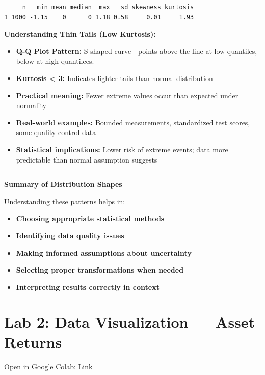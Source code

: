 \documentclass[
  12pt,
  a4paper,
]{scrbook}
\providecommand{\tightlist}{%
  \setlength{\itemsep}{0pt}\setlength{\parskip}{0pt}}
\renewcommand{\tightlist}{\setlength{\itemsep}{0.5\baselineskip}\setlength{\parskip}{0.2\baselineskip}}
\theoremstyle{plain}
\theoremstyle{definition}
\theoremstyle{remark}
\begin{document}
\begin{verbatim}
     n   min mean median  max   sd skewness kurtosis
1 1000 -1.15    0      0 1.18 0.58     0.01     1.93
\end{verbatim}

\textbf{Understanding Thin Tails (Low Kurtosis):}

\begin{itemize}
\tightlist
\item
  \textbf{Q-Q Plot Pattern:} S-shaped curve - points above the line at
  low quantiles, below at high quantilees.
\item
  \textbf{Kurtosis \textless{} 3:} Indicates lighter tails than normal
  distribution
\item
  \textbf{Practical meaning:} Fewer extreme values occur than expected
  under normality
\item
  \textbf{Real-world examples:} Bounded measurements, standardized test
  scores, some quality control data
\item
  \textbf{Statistical implications:} Lower risk of extreme events; data
  more predictable than normal assumption suggests
\end{itemize}

\begin{center}\rule{0.5\linewidth}{0.5pt}\end{center}

\textbf{Summary of Distribution Shapes}

Understanding these patterns helps in:

\begin{itemize}
\tightlist
\item
  \textbf{Choosing appropriate statistical methods}
\item
  \textbf{Identifying data quality issues}
\item
  \textbf{Making informed assumptions about uncertainty}
\item
  \textbf{Selecting proper transformations when needed}
\item
  \textbf{Interpreting results correctly in context}
\end{itemize}

\chapter{Lab 2: Data Visualization --- Asset
Returns}\label{lab-2-data-visualization-asset-returns}

Open in Google Colab:
\href{https://colab.research.google.com/drive/15klt5pDuQFp413jkLaUeh7rIH_WOlCfK?usp=share_link}{Link}
\end{document}
